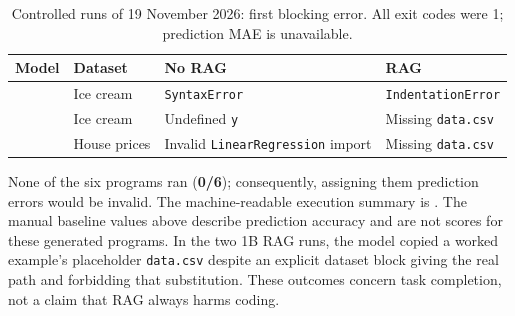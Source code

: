 \begin{table}[htbp]
\centering\footnotesize
\caption{Controlled runs of 19 November 2026: first blocking error. All exit codes were 1; prediction MAE is unavailable.}
\label{tab:controlled}
\begin{tabularx}{\linewidth}{@{}llYY@{}}
\toprule
\textbf{Model} & \textbf{Dataset} & \textbf{No RAG} & \textbf{RAG}\\
\midrule
{} & Ice cream & \texttt{SyntaxError} & \texttt{IndentationError}\\
 & Ice cream & Undefined \texttt{y} & Missing \texttt{data.csv}\\
 & House prices & Invalid \texttt{LinearRegression} import & Missing \texttt{data.csv}\\
\bottomrule
\end{tabularx}
\end{table}

None of the six programs ran (\textbf{0/6}); consequently, assigning them prediction errors would be invalid.
The machine-readable execution summary is .
The manual baseline values above describe prediction accuracy and are not scores for these generated programs.
In the two 1B RAG runs, the model copied a worked example's placeholder \texttt{data.csv} despite an explicit dataset block giving
the real path and forbidding that substitution.
These outcomes concern task completion, not a claim that RAG always harms coding.
